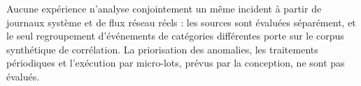 
Aucune expérience n'analyse conjointement un même incident à partir de journaux système et de flux réseau réels : les sources sont évaluées séparément, et le seul regroupement d'événements de catégories différentes porte sur le corpus synthétique de corrélation. La priorisation des anomalies, les traitements périodiques et l'exécution par micro-lots, prévus par la conception, ne sont pas évalués.

